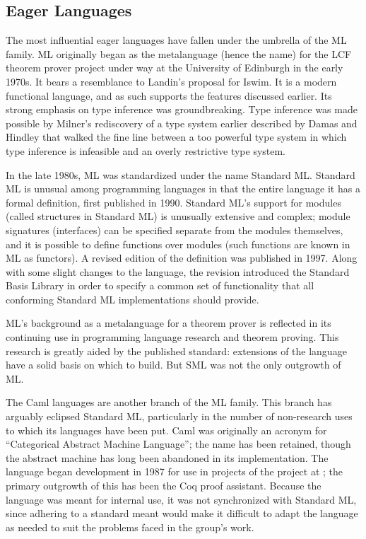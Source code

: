 \subsection{Eager Languages}
The most influential eager languages have fallen under the umbrella of the ML family. ML originally began as the metalanguage (hence the name) for the LCF theorem prover project under way at the University of Edinburgh in the early 1970s. It bears a resemblance to Landin's proposal for Iswim. It is a modern functional language, and as such supports the features discussed earlier. Its strong emphasis on type inference was groundbreaking. Type inference was made possible by Milner's rediscovery of a type system earlier described by Damas and Hindley that walked the fine line between a too powerful type system in which type inference is infeasible and an overly restrictive type system.

In the late 1980s, ML was standardized under the name Standard ML. Standard ML is unusual among programming languages in that the entire language it has a formal definition, first published in 1990. Standard ML's support for modules (called structures in Standard ML) is unusually extensive and complex; module signatures (interfaces) can be specified separate from the modules themselves, and it is possible to define functions over modules (such functions are known in ML as functors). A revised edition of the definition was published in 1997. Along with some slight changes to the language, the revision introduced the Standard Basis Library in order to specify a common set of functionality that all conforming Standard ML implementations should provide.

ML's background as a metalanguage for a theorem prover is reflected in its continuing use in programming language research and theorem proving. This research is greatly aided by the published standard: extensions of the language have a solid basis on which to build. But SML was not the only outgrowth of ML.

The Caml languages are another branch of the ML family. This branch has arguably eclipsed Standard ML, particularly in the number of non-research uses to which its languages have been put. Caml was originally an acronym for ``Categorical Abstract Machine Language''; the name has been retained, though the abstract machine has long been abandoned in its implementation. The language began development in 1987 for use in projects of the  project at ; the primary outgrowth of this has been the Coq proof assistant. Because the language was meant for internal use, it was not synchronized with Standard ML, since adhering to a standard meant would make it difficult to adapt the language as needed to suit the problems faced in the group's work.

